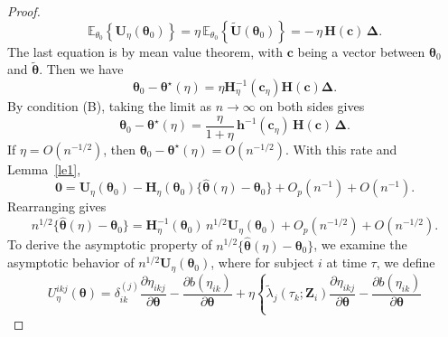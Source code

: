 \documentclass{article}
\theoremstyle{plain}
\theoremstyle{definition}
\theoremstyle{remark}
\begin{document}
\begin{proof}
\begin{equation*}
\mathbb{E}_{\theta_0}\!\left\{\boldsymbol{U}_{\eta}(\boldsymbol{\theta}_0)\right\}
= \eta\, \mathbb{E}_{\theta_0}\!\left\{\widetilde{\boldsymbol{U}}(\boldsymbol{\theta}_0)\right\}
= -\,\eta\, \boldsymbol{H}(\boldsymbol{c})\,\boldsymbol{\Delta}.
\end{equation*}
The last equation is by mean value theorem,  with $\boldsymbol{c}$ being a vector between $\boldsymbol{\theta}_0$ and $\tilde{\boldsymbol{\theta}}$. Then we have
\begin{equation*}
    \boldsymbol{\theta}_0-\boldsymbol{\theta}^\star(\eta)=\eta \boldsymbol{H}_{\eta}^{-1}(\boldsymbol{c}_\eta) \boldsymbol{H}(\boldsymbol{c}) \boldsymbol{\Delta}.
\end{equation*}
By condition (B), taking the limit as $n \rightarrow \infty$ on both sides gives
\begin{equation*}
\boldsymbol{\theta}_0-\boldsymbol{\theta}^\star(\eta)
= \frac{\eta}{1+\eta}\,
\boldsymbol{h}^{-1}\!\left(\boldsymbol{c}_\eta\right)\,
\boldsymbol{H}(\boldsymbol{c})\,\boldsymbol{\Delta}.
\end{equation*}
If $\eta=O(n^{-1/2})$, then $\boldsymbol{\theta}_0-\boldsymbol{\theta}^\star(\eta)=O(n^{-1/2})$. With this rate and Lemma~\ref{le1},
\begin{equation*}
\boldsymbol{0}
= \boldsymbol{U}_{\eta}(\boldsymbol{\theta}_0)
- \boldsymbol{H}_{\eta}(\boldsymbol{\theta}_0)\bigl\{\hat{\boldsymbol{\theta}}(\eta)-\boldsymbol{\theta}_0\bigr\}
+ O_p(n^{-1}) + O(n^{-1}).
\end{equation*}
Rearranging gives 
\begin{equation*}
n^{1/2}\bigl\{\hat{\boldsymbol{\theta}}(\eta)-\boldsymbol{\theta}_0\bigr\}
= \boldsymbol{H}_\eta^{-1}(\boldsymbol{\theta}_0)\,n^{1/2}\boldsymbol{U}_{\eta}(\boldsymbol{\theta}_0)
+ O_p(n^{-1/2}) + O(n^{-1/2}).
\end{equation*}
To derive the asymptotic property of $n^{1/2}\{\hat{\boldsymbol{\theta}}(\eta)-\boldsymbol{\theta}_0\}$, we examine the asymptotic behavior of $n^{1/2}\boldsymbol{U}_{\eta}(\boldsymbol{\theta}_0)$, where for subject $i$ at time $\tau$, we define
\begin{equation*}
U^{ikj}_\eta(\boldsymbol{\theta})
= \delta_{ik}^{(j)} \frac{\partial \eta_{ikj}}{\partial \boldsymbol{\theta}}
- \frac{\partial b(\eta_{ik})}{\partial \boldsymbol{\theta}}
+ \eta\left\{
\tilde\lambda_j(\tau_k;\boldsymbol{Z}_{i}) \frac{\partial \eta_{ikj}}{\partial \boldsymbol{\theta}}
- \frac{\partial b(\eta_{ik})}{\partial \boldsymbol{\theta}}

\end{equation*}
\end{proof}
\end{document}
